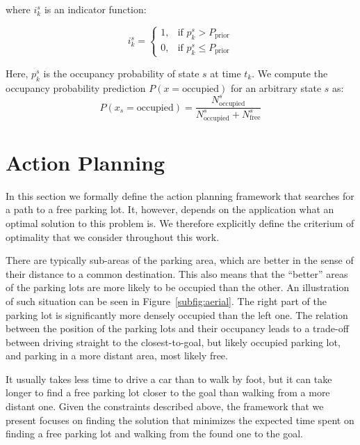 where $i_k^s$ is an indicator function:

\begin{equation}
i_k^s = \begin{cases}
1, & \mbox{if } p_k^s > P_\mathrm{prior} \\
0, & \mbox{if } p_k^s \leq P_\mathrm{prior}
\end{cases}
\end{equation}

Here, $p_k^s$ is the occupancy probability of state $s$ at time $t_k$. We compute the occupancy probability prediction $P(x = \mathrm{occupied})$ for an arbitrary state $s$ as:
\begin{equation}
P(x_s = \mathrm{occupied}) = \frac{N_\mathrm{occupied}^s}{N_\mathrm{occupied}^s + N_\mathrm{free}^s}
\end{equation}



\section{Action Planning} %
\label{sec:action_planning}

In this section we formally define the action planning framework that searches
for a path to a free parking lot. It, however, depends on the application what
an optimal solution to this problem is. We therefore explicitly define the
criterium of optimality that we consider throughout this work.

There are typically sub-areas of the parking area, which are better in the
sense of their distance to a common destination. This also means that the
``better'' areas of the parking lots are more likely to be occupied than the
other. An illustration of such situation can be seen in
Figure~\ref{subfig:aerial}. The right part of the parking lot is significantly
more densely occupied than the left one. The relation between the position of
the parking lots and their occupancy leads to a trade-off between driving
straight to the closest-to-goal, but likely occupied parking lot, and parking
in a more distant area, most likely free.

It usually takes less time to drive a car than to walk by foot, but it can
take longer to find a free parking lot closer to the goal than walking from a
more distant one. Given the constraints described above, the framework that we
present focuses on finding the solution that minimizes the expected time spent
on finding a free parking lot and walking from the found one to the goal.

